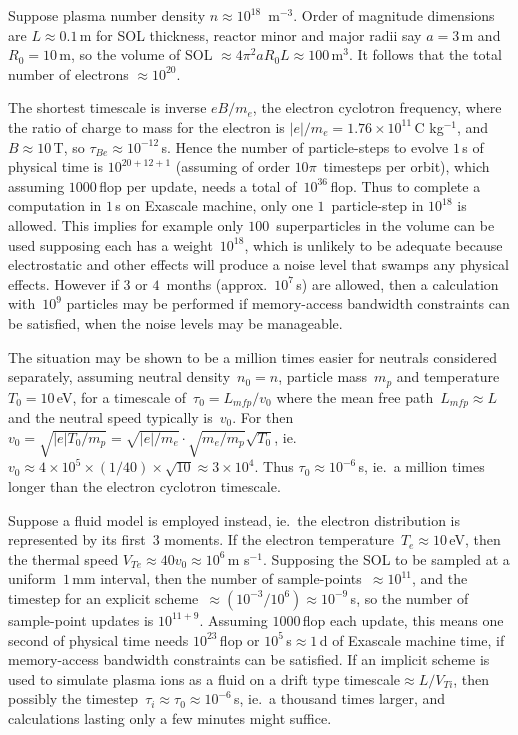 Suppose plasma number density $n \approx 10^{18}$\, m$^{-3}$. Order of magnitude
dimensions are $L\approx0.1$\,m for SOL thickness, reactor minor and major radii
say $a=3$\,m and $R_0=10$\,m, so the volume of SOL $\approx 4 \pi^2 a R_0 L \approx 100$\,m$^3$.
It follows that the total number of electrons $\approx 10^{20}$.

The shortest timescale is inverse $e B/m_e$, the electron cyclotron frequency, where the
ratio of charge to mass for the electron is
$|e|/m_e = 1.76 \times 10^{11}$\,C kg$^{-1}$, and $B\approx 10$\,T, so $\tau_{Be}\approx 10^{-12}$\,s.
Hence the number of particle-steps to evolve $1$\,s of physical time is  $10^{20+12+1}$
(assuming of order $10\pi$~timesteps per orbit),
which assuming $1000$\,flop per update, needs a total of~$10^{36}$\,flop.
Thus to complete a computation in $1$\,s on Exascale machine, only one
$1$~particle-step in $10^{18}$ is allowed.
This implies for example only $100$~superparticles in the volume can be used supposing
each has a weight~$10^{18}$, which
is unlikely to be adequate because electrostatic and other effects will produce a noise level
that swamps any physical effects. However if $3$ or $4$~months (approx.~$10^7$\,s) are allowed, then
a calculation with~$10^9$ particles may be performed if memory-access bandwidth constraints
can be satisfied, when the noise levels may be manageable.

The situation may be shown to be a million times easier for neutrals considered
separately, assuming neutral density~$n_0=n$, particle mass~$m_p$ and temperature~$T_0=10$\,eV, for a
timescale of~$\tau_{0}=L_{mfp}/v_0$ where the mean free path~$L_{mfp}\approx L$ and the neutral
speed typically is~$v_0$. For then $v_0=\sqrt{|e|T_0/m_p}
=\sqrt{|e|/m_e} \cdot \sqrt{m_e/m_p} \sqrt{T_0}$, ie.\ 
$v_{0}\approx 4 \times 10^5 \times (1/40) \times \sqrt{10}\approx 3 \times 10^4$. Thus
$\tau_0\approx 10^{-6}$\,s, ie.\  a million times longer than the electron cyclotron timescale.

Suppose a fluid model is employed instead, ie.\ the electron distribution is
represented by its first~$3$ moments.
If the electron temperature~$T_e \approx 10$\,eV, then the
thermal speed $V_{Te}\approx 40 v_0 \approx 10^6$\,m s$^{-1}$. Supposing the SOL to be sampled at a
uniform~$1$\,mm interval, then the
number of sample-points~$\approx 10^{11}$, and the timestep for an explicit scheme~$\approx (10^{-3} /10^6)\approx 10^{-9}$\,s,
so the number of sample-point updates is $10^{11+9}$. Assuming  $1000$\,flop each update, this
means one second of physical time needs $10^{23}$\,flop or $10^5$\,s$\approx 1$\,d
of Exascale machine time, if memory-access bandwidth constraints can be satisfied. If an implicit scheme
is used to simulate plasma ions as a fluid on a drift type timescale$\approx L/V_{Ti}$, then
possibly the timestep~$\tau_i\approx \tau_0\approx 10^{-6}$\,s, ie.\ a thousand times larger, and
calculations lasting only a few minutes might suffice.

